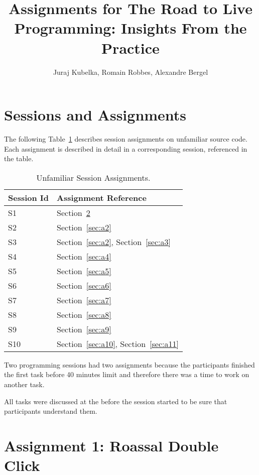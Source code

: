 \documentclass[table,a4paper]{article}
\newcommand{\tabref}[1]{Table~\ref{tab:#1}}
\newcommand{\secref}[1]{Section~\ref{sec:#1}}
\begin{document}
\title{Assignments for The Road to Live Programming: Insights From the Practice}

\author{Juraj Kubelka, Romain Robbes, Alexandre Bergel}

\maketitle

\section{Sessions and Assignments}
\label{sec:sessions}

The following \tabref{participants} describes session assignments on unfamiliar source code. Each assignment is described in detail in a corresponding session, referenced in the table.

\begin{table}[h]
  \caption{Unfamiliar Session Assignments.}
  \label{tab:participants}
  \centering
  \begin{tabular}{ll}
\hline
Session Id & Assignment Reference \\
\hline
S1  &   \secref{a1}      \\
S2  &  \secref{a2}     \\
S3  &   \secref{a2}, \secref{a3}      \\
S4  &    \secref{a4}    \\
S5  &    \secref{a5}    \\
S6  &     \secref{a6}    \\
S7  &    \secref{a7}    \\
S8  &     \secref{a8}    \\
S9  &      \secref{a9}    \\
S10 &      \secref{a10}, \secref{a11}  \\
\hline
  \end{tabular}
\end{table}

Two programming sessions had two assignments because the participants finished the first task before 40 minutes limit and therefore there was a time to work on another task. 

All tasks were discussed at the before the session started to be sure that participants understand them.

\clearpage{}

\section{Assignment 1: Roassal Double Click}
\label{sec:a1}
\end{document}
